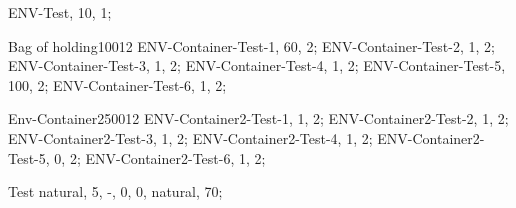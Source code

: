 


\begin{Gear}
	ENV-Test, 10, 1;
\end{Gear}

\begin{Container}[weightless = true, symbol = 1]{Bag of holding}{100}{12}
	ENV-Container-Test-1, 60, 2;
	ENV-Container-Test-2, 1, 2;
	ENV-Container-Test-3, 1, 2;
	ENV-Container-Test-4, 1, 2;
	ENV-Container-Test-5, 100, 2;
	ENV-Container-Test-6, 1, 2;
\end{Container}
\begin{Container}[symbol = 2]{Env-Container2}{500}{12}
	ENV-Container2-Test-1, 1, 2;
	ENV-Container2-Test-2, 1, 2;
	ENV-Container2-Test-3, 1, 2;
	ENV-Container2-Test-4, 1, 2;
	ENV-Container2-Test-5, 0, 2;
	ENV-Container2-Test-6, 1, 2;
\end{Container}

\begin{ACitem}
	Test natural, 5, -, 0, 0, natural, 70;
\end{ACitem}

